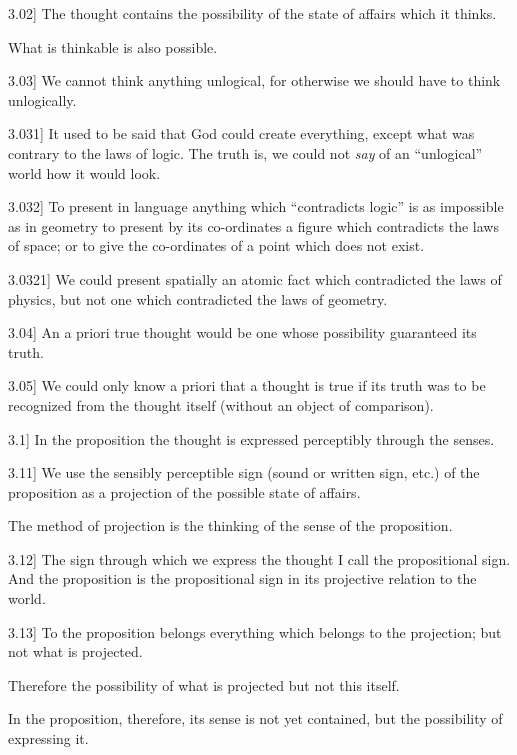 \documentclass[12pt,oneside]{book}[2007/10/19]
\newcommand{\PropositionE}[2]{%
  \item[\phantomsection\label{PropE:#1}\PropGRef{#1}] #2%
}
\newcommand{\PropGRef}[1]{\hyperref[PropG:#1]{#1}}
\begin{document}
\begin{propositions}
\PropositionE{3.02}
{The thought contains the possibility of the state
of affairs which it thinks.
\enlargethispage{3pt} %

What is thinkable is also possible.}


\PropositionE{3.03}
{We cannot think anything unlogical, for otherwise
we should have to think unlogically.}


\PropositionE{3.031}
{It used to be said that God could create everything,
except what was contrary to the laws of logic.
The truth is, we could not \emph{say} of an ``unlogical''
world how it would look.}


\PropositionE{3.032}
{To present in language anything which
``contradicts logic'' is as impossible as in
geometry to present by its co-ordinates a figure
which contradicts the laws of space; or to give
the co-ordinates of a point which does not
exist.}


\PropositionE{3.0321}
{We could present spatially an atomic fact which
contradicted the laws of physics, but not one which
contradicted the laws of geometry.}


\PropositionE{3.04}
{An a priori true thought would be one whose
possibility guaranteed its truth.}


\PropositionE{3.05}
{We could only know a priori that a thought
is true if its truth was to be recognized from
the thought itself (without an object of comparison).}


\PropositionE{3.1}
{In the proposition the thought is expressed
perceptibly through the senses.}


\PropositionE{3.11}
{We use the sensibly perceptible sign (sound or
written sign, etc.) of the proposition as a projection
of the possible state of affairs.

The method of projection is the thinking of
the sense of the proposition.}


\PropositionE{3.12}
{The sign through which we express the thought
I call the propositional sign. And the proposition
is the propositional sign in its projective
relation to the world.}


\PropositionE{3.13}
{To the proposition belongs everything which
belongs to the projection; but not what is projected.

Therefore the possibility of what is projected but
not this itself.

In the proposition, therefore, its sense is not yet
contained, but the possibility of expressing it.

}
\end{propositions}
\end{document}
